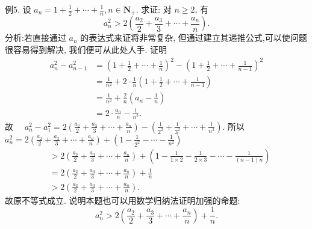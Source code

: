 例5. 设 $a_n=1+\frac{1}{2}+\cdots+\frac{1}{n}, n \in \mathbf{N}_{+}$. 求证: 对 $n \geqslant 2$, 有
$$
a_n^2>2\left(\frac{a_2}{2}+\frac{a_3}{3}+\cdots+\frac{a_n}{n}\right) .
$$
分析:若直接通过 $a_n$ 的表达式来证将非常复杂, 但通过建立其递推公式,可以使问题很容易得到解决, 我们便可从此处人手.
证明
$$
\begin{aligned}
a_n^2-a_{n-1}^2 & =\left(1+\frac{1}{2}+\cdots+\frac{1}{n}\right)^2-\left(1+\frac{1}{2}+\cdots+\frac{1}{n-1}\right)^2 \\
& =\frac{1}{n^2}+2 \cdot \frac{1}{n}\left(1+\frac{1}{2}+\cdots+\frac{1}{n-1}\right) \\
& =\frac{1}{n^2}+\frac{2}{n}\left(a_n-\frac{1}{n}\right) \\
& =2 \cdot \frac{a_n}{n}-\frac{1}{n^2} .
\end{aligned}
$$
故 $\quad a_n^2-a_1^2=2\left(\frac{a_2}{2}+\frac{a_3}{3}+\cdots+\frac{a_n}{n}\right)-\left(\frac{1}{2^2}+\frac{1}{3^2}+\cdots+\frac{1}{n^2}\right)$.
所以 $a_n^2=2\left(\frac{a_2}{2}+\frac{a_3}{3}+\cdots+\frac{a_n}{n}\right)+\left(1-\frac{1}{2^2}-\cdots-\frac{1}{n^2}\right)$
$$
\begin{aligned}
& >2\left(\frac{a_2}{2}+\frac{a_3}{3}+\cdots+\frac{a_n}{n}\right)+\left(1-\frac{1}{1 \times 2}-\frac{1}{2 \times 3}-\cdots-\frac{1}{(n-1) n}\right) \\
& =2\left(\frac{a_2}{2}+\frac{a_3}{3}+\cdots+\frac{a_n}{n}\right)+\frac{1}{n} \\
& >2\left(\frac{a_2}{2}+\frac{a_3}{3}+\cdots+\frac{a_n}{n}\right) .
\end{aligned}
$$
故原不等式成立.
说明本题也可以用数学归纳法证明加强的命题:
$$
a_n^2>2\left(\frac{a_2}{2}+\frac{a_3}{3}+\cdots+\frac{a_n}{n}\right)+\frac{1}{n} .
$$



